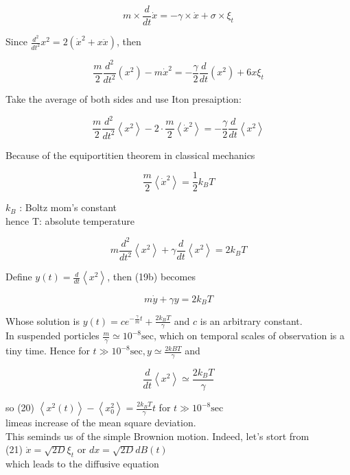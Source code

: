 \documentclass[10pt]{article}
\begin{document}
$$
m \times \frac{d}{d t} \dot{x}=-\gamma \times \dot{x}+\sigma \times \xi_{t}
$$

Since $\frac{d^{2}}{d t^{2}} x^{2}=2\left(\dot{x}^{2}+x \ddot{x}\right)$, then

$$
\frac{m}{2} \frac{d^{2}}{d t^{2}}\left(x^{2}\right)-m \dot{x}^{2}=-\frac{\gamma}{2} \frac{d}{d t}\left(x^{2}\right)+6 x \xi_{t}
$$

Take the average of both sides and use Iton presaiption:

$$
\frac{m}{2} \frac{d^{2}}{d t^{2}}\left\langle x^{2}\right\rangle-2 \cdot \frac{m}{2}\left\langle\dot{x}^{2}\right\rangle=-\frac{\gamma}{2} \frac{d}{d t}\left\langle x^{2}\right\rangle
$$

Because of the equiportitien theorem in classical mechanics

$$
\frac{m}{2}\left\langle\dot{x}^{2}\right\rangle=\frac{1}{2} k_{B} T
$$

$k_{B}$ : Boltz mom's constant\\
hence T: absolute temperature


\begin{equation*}
m \frac{d^{2}}{d t^{2}}\left\langle x^{2}\right\rangle+\gamma \frac{d}{d t}\left\langle x^{2}\right\rangle=2 k_{B} T \tag{196}
\end{equation*}


Define $y(t)=\frac{d}{d t}\left\langle x^{2}\right\rangle$, then (19b) becomes

$$
m \dot{y}+\gamma y=2 k_{B} T
$$

Whose solution is $y(t)=c e^{-\frac{\gamma}{m} t}+\frac{2 k_{B} T}{\gamma}$ and $c$ is an arbitrary constant.\\
In suspended porticles $\frac{m}{\gamma} \simeq 10^{-8} \mathrm{sec}$, which on temporal scales of observation is a tiny time. Hence for $t \gg 10^{-8} \mathrm{sec}, y \simeq \frac{2 k B T}{\gamma}$ and

$$
\frac{d}{d t}\left\langle x^{2}\right\rangle \simeq \frac{2 k_{B} T}{\gamma}
$$

so (20) $\left\langle x^{2}(t)\right\rangle-\left\langle x_{0}^{2}\right\rangle=\frac{2 k_{B} T}{\gamma} t$ for $t \gg 10^{-8} \mathrm{sec}$\\
limeas increase of the mean square deviation.\\
This seminds us of the simple Brownion motion. Indeed, let's stort from\\
(21) $\dot{x}=\sqrt{2 D} \xi_{t}$ or $d x=\sqrt{2 D} d B(t)$\\
which leads to the diffusive equation
\end{document}
